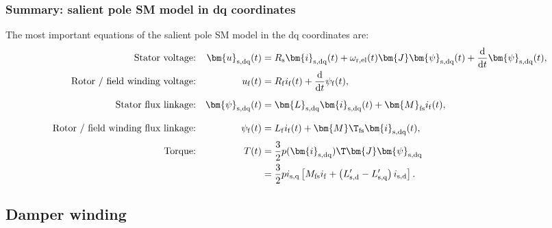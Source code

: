 \begin{frame}
	\frametitle{Summary: salient pole SM model in dq coordinates}
    The most important equations of the salient pole SM model in the  dq coordinates are:
	\begin{equation*}
		\begin{alignedat}{4}
			&&\mbox{Stator voltage:}&& \quad\bm{u}_\mathrm{s,dq}(&t) &&= R_\mathrm{s} \bm{i}_\mathrm{s,dq}(t)+ \omega_\mathrm{r,el}(t)\bm{J}\bm{\psi}_\mathrm{s,dq}(t) + \frac{\mathrm{d}}{\mathrm{d}t}\bm{\psi}_\mathrm{s,dq}(t),\\
			&&\mbox{Rotor / field winding  voltage:}&& \quad u_\mathrm{f}(&t) &&= R_\mathrm{f}i_\mathrm{f}(t)+\frac{\mathrm{d}}{\mathrm{d}t}\psi_\mathrm{f}(t),\\
			&&\mbox{Stator flux linkage:}&& \quad \bm{\psi}_\mathrm{s,dq}(&t) &&= \bm{L}_\mathrm{s,dq}\bm{i}_{\mathrm{s,dq}}(t) + \bm{M}_\mathrm{fs} i_{\mathrm{f}}(t), \vphantom{\frac{\mathrm{d}}{\mathrm{d}t}}\\
			&&\mbox{Rotor / field winding flux linkage:}&& \psi_\mathrm{f}(&t) &&= L_\mathrm{f} i_\mathrm{f}(t) + \bm{M}\T_\mathrm{fs} \bm{i}_\mathrm{s,dq}(t),\vphantom{\frac{\mathrm{d}}{\mathrm{d}t}}\\
			&&\mbox{Torque:}&& \quad T(&t) &&= \frac{3}{2} p (\bm{i}_\mathrm{s,dq})\T\bm{J}\bm{\psi}_\mathrm{s,dq}\\
			&&&&&&&=\frac{3}{2} p i_\mathrm{s,q}\left[ M_\mathrm{fs} i_{\mathrm{f}} + \left(L'_\mathrm{s,d}-L'_\mathrm{s,q}\right)i_\mathrm{s,d}\right].
		\end{alignedat}
	\end{equation*}      
\end{frame}

\subsection{Damper winding}


